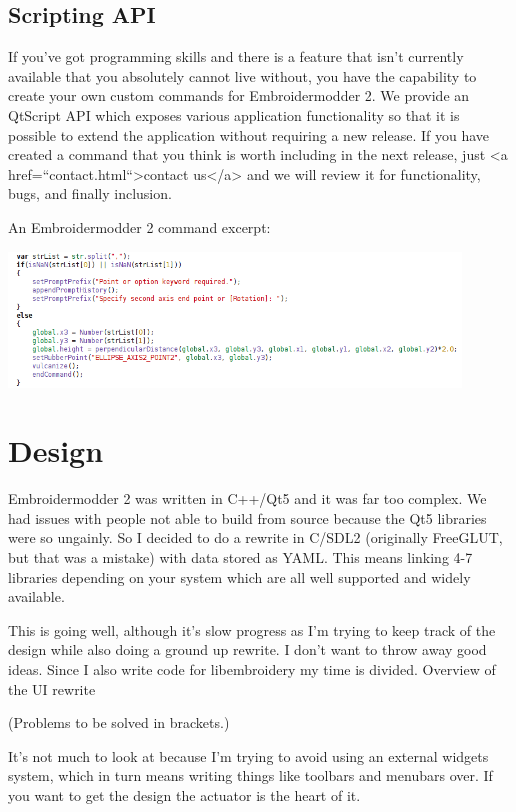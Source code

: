 \documentclass{report}
\begin{document}
\section{Scripting API}

If you've got programming skills and there is a feature that isn't currently available that you absolutely cannot live without, you have the capability to create your own custom commands for Embroidermodder 2. We provide an QtScript API which exposes various application functionality so that it is possible to extend the application without requiring a new release. If you have created a command that you think is worth including in the next release, just <a href=``contact.html``>contact us</a> and we will review it for functionality, bugs, and finally inclusion.

An Embroidermodder 2 command excerpt:

\includegraphics[width=0.9\textwidth]{images/features-scripting-1.png}

\chapter{Design}

Embroidermodder 2 was written in C++/Qt5 and it was far too complex. We had issues with people
not able to build from source because the Qt5 libraries were so ungainly. So I decided to do a
rewrite in C/SDL2 (originally FreeGLUT, but that was a mistake) with data stored as YAML. This
means linking 4-7 libraries depending on your system which are all well supported and widely available.

This is going well, although it's slow progress as I'm trying to keep track of the design while
also doing a ground up rewrite. I don't want to throw away good ideas. Since I also write code
for libembroidery my time is divided.
Overview of the UI rewrite

(Problems to be solved in brackets.)

It's not much to look at because I'm trying to avoid using an external widgets system, which
in turn means writing things like toolbars and menubars over. If you want to get the design
the actuator is the heart of it.
\end{document}
